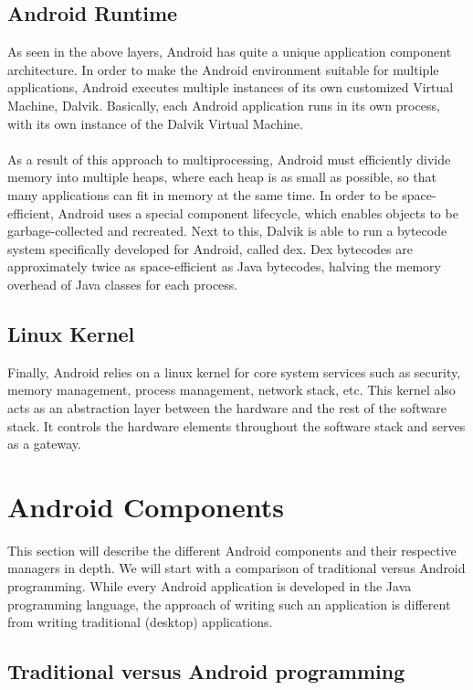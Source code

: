 \subsection{Android Runtime}

As seen in the above layers, Android has quite a unique application component architecture. In order to make the Android environment suitable for multiple applications, Android executes multiple instances of its own customized Virtual Machine, Dalvik. Basically, each Android application runs in its own process, with its own instance of the Dalvik Virtual Machine. 
\\ \\
As a result of this approach to multiprocessing, Android must efficiently divide memory into multiple heaps, where each heap is as small as possible, so that many applications can fit in memory at the same time. In order to be space-efficient, Android uses a special component lifecycle, which enables objects to be garbage-collected and recreated. Next to this, Dalvik is able to run a bytecode system specifically developed for Android, called dex. Dex bytecodes are approximately twice as space-efficient as Java bytecodes, halving the memory overhead of Java classes for each process.

\subsection{Linux Kernel}

Finally, Android relies on a linux kernel for core system services such as security, memory management, process management, network stack, etc. This kernel also acts as an abstraction layer between the hardware and the rest of the software stack. It controls the hardware elements throughout the software stack and serves as a gateway.

\section{Android Components}

This section will describe the different Android components and their respective managers in depth. We will start with a comparison of traditional versus Android programming. While every Android application is developed in the Java programming language, the approach of writing such an application is different from writing traditional (desktop) applications.

\subsection{Traditional versus Android programming}

